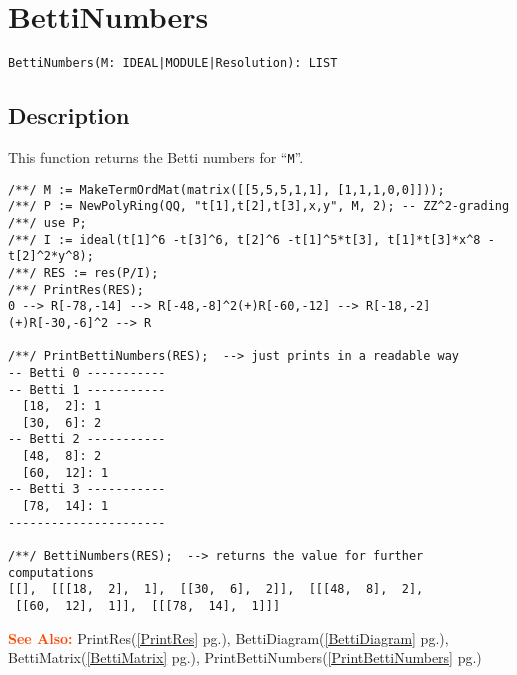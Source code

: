 \documentclass[a4paper]{mybook}
\newenvironment{command}{}{} %
\newcommand\SeeAlso{\par\textcolor{OrangeRed}{\textbf{\large See Also: }}}
\begin{document}
\section{BettiNumbers}
\label{BettiNumbers}
\begin{command} %


\begin{Verbatim}[label=syntax, rulecolor=\color{MidnightBlue},
frame=single]
BettiNumbers(M: IDEAL|MODULE|Resolution): LIST
\end{Verbatim}


\subsection*{Description}

This function returns the Betti numbers for ``\verb&M&''.
\begin{Verbatim}[label=example, rulecolor=\color{PineGreen}, frame=single]
/**/ M := MakeTermOrdMat(matrix([[5,5,5,1,1], [1,1,1,0,0]]));
/**/ P := NewPolyRing(QQ, "t[1],t[2],t[3],x,y", M, 2); -- ZZ^2-grading
/**/ use P;
/**/ I := ideal(t[1]^6 -t[3]^6, t[2]^6 -t[1]^5*t[3], t[1]*t[3]*x^8 -t[2]^2*y^8);
/**/ RES := res(P/I);
/**/ PrintRes(RES);
0 --> R[-78,-14] --> R[-48,-8]^2(+)R[-60,-12] --> R[-18,-2](+)R[-30,-6]^2 --> R

/**/ PrintBettiNumbers(RES);  --> just prints in a readable way
-- Betti 0 -----------
-- Betti 1 -----------
  [18,  2]: 1
  [30,  6]: 2
-- Betti 2 -----------
  [48,  8]: 2
  [60,  12]: 1
-- Betti 3 -----------
  [78,  14]: 1
----------------------

/**/ BettiNumbers(RES);  --> returns the value for further computations
[[],  [[[18,  2],  1],  [[30,  6],  2]],  [[[48,  8],  2],
 [[60,  12],  1]],  [[[78,  14],  1]]]
\end{Verbatim}


\SeeAlso %
  PrintRes(\ref{PrintRes} pg.\pageref{PrintRes}), 
    BettiDiagram(\ref{BettiDiagram} pg.\pageref{BettiDiagram}), 
    BettiMatrix(\ref{BettiMatrix} pg.\pageref{BettiMatrix}), 
    PrintBettiNumbers(\ref{PrintBettiNumbers} pg.\pageref{PrintBettiNumbers})
\end{command} %
\end{document}
